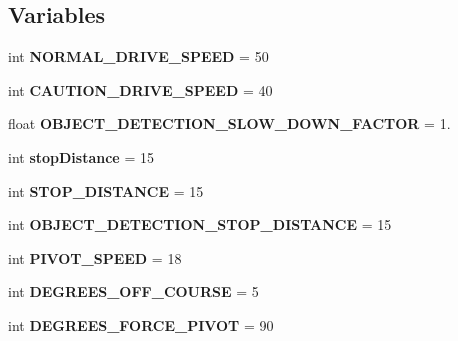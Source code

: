 \subsection*{Variables}
\begin{DoxyCompactItemize}
\item 
\mbox{\label{namespacemcs_1_1DriveSysControl_a2ced69844118de592dfa784bb2abc59e}} 
int {\bfseries N\+O\+R\+M\+A\+L\+\_\+\+D\+R\+I\+V\+E\+\_\+\+S\+P\+E\+ED} = 50
\item 
\mbox{\label{namespacemcs_1_1DriveSysControl_a81c9f03eb253003f64720be3056c7f1f}} 
int {\bfseries C\+A\+U\+T\+I\+O\+N\+\_\+\+D\+R\+I\+V\+E\+\_\+\+S\+P\+E\+ED} = 40
\item 
\mbox{\label{namespacemcs_1_1DriveSysControl_aaea1d169d3a28801b290d48852853bac}} 
float {\bfseries O\+B\+J\+E\+C\+T\+\_\+\+D\+E\+T\+E\+C\+T\+I\+O\+N\+\_\+\+S\+L\+O\+W\+\_\+\+D\+O\+W\+N\+\_\+\+F\+A\+C\+T\+OR} = 1.
\item 
\mbox{\label{namespacemcs_1_1DriveSysControl_a2ac32a54e0dcfff13930c20cbe859cc0}} 
int {\bfseries stop\+Distance} = 15
\item 
\mbox{\label{namespacemcs_1_1DriveSysControl_a799a503dcc4f434b8436e7c925a61279}} 
int {\bfseries S\+T\+O\+P\+\_\+\+D\+I\+S\+T\+A\+N\+CE} = 15
\item 
\mbox{\label{namespacemcs_1_1DriveSysControl_a07a860f09c289430bc0c1018bb0643bf}} 
int {\bfseries O\+B\+J\+E\+C\+T\+\_\+\+D\+E\+T\+E\+C\+T\+I\+O\+N\+\_\+\+S\+T\+O\+P\+\_\+\+D\+I\+S\+T\+A\+N\+CE} = 15
\item 
\mbox{\label{namespacemcs_1_1DriveSysControl_aff1c57e14ece13fc979821f5c40db086}} 
int {\bfseries P\+I\+V\+O\+T\+\_\+\+S\+P\+E\+ED} = 18
\item 
\mbox{\label{namespacemcs_1_1DriveSysControl_a0804f1061d1e87813bd62cf176c44893}} 
int {\bfseries D\+E\+G\+R\+E\+E\+S\+\_\+\+O\+F\+F\+\_\+\+C\+O\+U\+R\+SE} = 5
\item 
\mbox{\label{namespacemcs_1_1DriveSysControl_a7ce4ca5a78aee862ed53b2fabff969dd}} 
int {\bfseries D\+E\+G\+R\+E\+E\+S\+\_\+\+F\+O\+R\+C\+E\+\_\+\+P\+I\+V\+OT} = 90
\end{DoxyCompactItemize}


